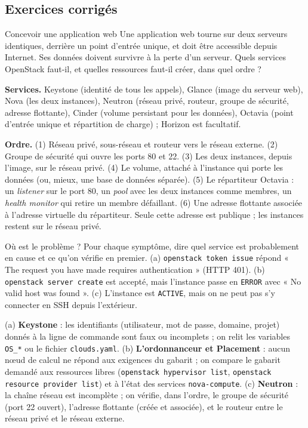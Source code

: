 \subsection{Exercices corrigés}\label{sec:pres-exercices}

\begin{exercice}{Concevoir une application web}\label{ex:pres-web}
Une application web tourne sur deux serveurs identiques, derrière un point d'entrée unique, et doit être accessible depuis Internet.
Ses données doivent survivre à la perte d'un serveur. Quels services OpenStack faut-il, et quelles ressources faut-il créer, dans quel
ordre ?
\end{exercice}
\begin{correction}
\textbf{Services.} Keystone (identité de tous les appels), Glance (image du serveur web), Nova (les deux instances), Neutron (réseau
privé, routeur, groupe de sécurité, adresse flottante), Cinder (volume persistant pour les données), Octavia (point d'entrée unique
et répartition de charge) ; Horizon est facultatif.

\textbf{Ordre.} (1) Réseau privé, sous-réseau et routeur vers le réseau externe. (2) Groupe de sécurité qui ouvre les ports 80 et 22.
(3) Les deux instances, depuis l'image, sur le réseau privé. (4) Le volume, attaché à l'instance qui porte les données (ou, mieux,
une base de données séparée). (5) Le répartiteur Octavia : un \emph{listener} sur le port 80, un \emph{pool} avec les deux instances
comme membres, un \emph{health monitor} qui retire un membre défaillant. (6) Une adresse flottante associée à l'adresse virtuelle du
répartiteur. Seule cette adresse est publique ; les instances restent sur le réseau privé.
\end{correction}

\begin{exercice}{Où est le problème ?}\label{ex:pres-symptomes}
Pour chaque symptôme, dire quel service est probablement en cause et ce qu'on vérifie en premier.
(a) \texttt{openstack token issue} répond « The request you have made requires authentication » (HTTP 401).
(b) \texttt{openstack server create} est accepté, mais l'instance passe en \texttt{ERROR} avec « No valid host was found ».
(c) L'instance est \texttt{ACTIVE}, mais on ne peut pas s'y connecter en SSH depuis l'extérieur.
\end{exercice}
\begin{correction}
(a) \textbf{Keystone} : les identifiants (utilisateur, mot de passe, domaine, projet) donnés à la ligne de commande sont faux ou
incomplets ; on relit les variables \texttt{OS\_*} ou le fichier \texttt{clouds.yaml}.
(b) \textbf{L'ordonnanceur et Placement} : aucun nœud de calcul ne répond aux exigences du gabarit ; on compare le gabarit demandé aux
ressources libres (\texttt{openstack hypervisor list}, \texttt{openstack resource provider list}) et à l'état des services
\texttt{nova-compute}.
(c) \textbf{Neutron} : la chaîne réseau est incomplète ; on vérifie, dans l'ordre, le groupe de sécurité (port 22 ouvert), l'adresse
flottante (créée et associée), et le routeur entre le réseau privé et le réseau externe.
\end{correction}

